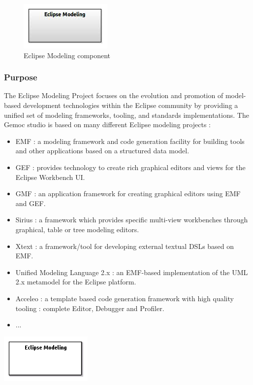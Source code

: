 \documentclass{gemoc} %
\begin{document}
\begin{figure}[htp]
	\begin{center}
	\includegraphics*[trim=0.0cm 0.0cm 0cm 0.0cm, clip=true, scale=1.0]{../images/generated/Generated_Eclipse Modeling.jpg}
	\caption{Eclipse Modeling component}
	\end{center}
\end{figure}

\subsubsection{Purpose}
The Eclipse Modeling Project focuses on the evolution and promotion of model-based development technologies within the Eclipse community by providing a unified set of modeling frameworks, tooling, and standards implementations. The Gemoc studio is based on many different Eclipse modeling projects :
\begin{itemize}
\item EMF : a modeling framework and code generation facility for building tools and other applications based on a structured data model.
\item GEF : provides technology to create rich graphical editors and views for the Eclipse Workbench UI.
\item GMF : an application framework for creating graphical editors using EMF and GEF.
\item Sirius : a framework which provides specific multi-view workbenches through graphical, table or tree modeling editors.
\item Xtext : a framework/tool for developing external textual DSLs based on EMF.
\item Unified Modeling Language 2.x : an EMF-based implementation of the UML 2.x metamodel for the Eclipse platform.
\item Acceleo : a template based code generation framework with high quality tooling : complete Editor, Debugger and Profiler.
\item ...
\end{itemize}
\begin{center}
\includegraphics*[trim=0.0cm 0.0cm 0cm 0.0cm, clip=true]{../images/generated/Generated_Eclipse_Modeling.png}
\end{center}
\end{document}
